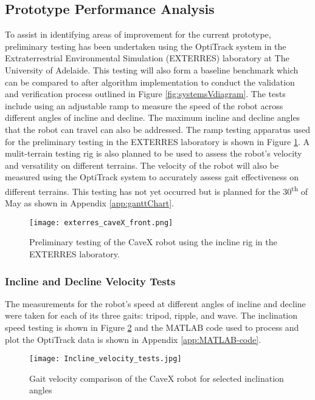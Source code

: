 \subsection{Prototype Performance Analysis}
\label{sec:prototype-performance}
To assist in identifying areas of improvement for the current prototype, preliminary testing has been undertaken using the OptiTrack system in the Extraterrestrial Environmental Simulation (EXTERRES) laboratory at The University of Adelaide. This testing will also form a baseline benchmark which can be compared to after algorithm implementation to conduct the validation and verification process outlined in Figure \ref{fig:systemsVdiagram}. The tests include using an adjustable ramp to measure the speed of the robot across different angles of incline and decline. The maximum incline and decline angles that the robot can travel can also be addressed. The ramp testing apparatus used for the preliminary testing in the EXTERRES laboratory is shown in Figure \ref{fig:testingappartus}. A mulit-terrain testing rig is also planned to be used to assess the robot's velocity and versatility on different terrains. The velocity of the robot will also be measured using the OptiTrack system to accurately assess gait effectiveness on different terrains. This testing has not yet occurred but is planned for the 30\textsuperscript{th} of May as shown in Appendix \ref{app:ganttChart}.

\begin{figure}[H]
    \centering
    \texttt{[image: exterres\_caveX\_front.png]}
    \caption{Preliminary testing of the CaveX robot using the incline rig in the EXTERRES laboratory.}
    \label{fig:testingappartus}
\end{figure}

\subsubsection{Incline and Decline Velocity Tests}
\label{sec:velocity-test}
The measurements for the robot's speed at different angles of incline and decline were taken for each of its three gaits: tripod, ripple, and wave. The inclination speed testing is shown in Figure \ref{fig:incline-velocity-test} and the MATLAB code used to process and plot the OptiTrack data is shown in Appendix \ref{app:MATLAB-code}.

\begin{figure}[H]
    \centering
    \texttt{[image: Incline\_velocity\_tests.jpg]}
    \caption{Gait velocity comparison of the CaveX robot for selected inclination angles}
    \label{fig:incline-velocity-test}
\end{figure}

